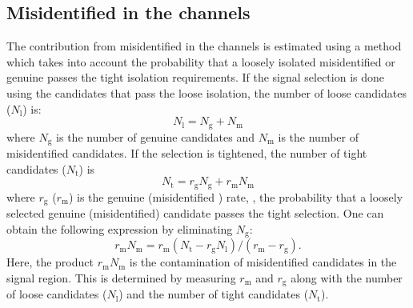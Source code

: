 \subsection{\texorpdfstring{Misidentified \Tau in the \leptonTau channels}{Misidentified tau in the lepton-tau channels}}
\label{sect:bkgFake}
The contribution from misidentified \Tau in the \leptonTau channels is estimated using a method which takes into account the probability
that a loosely isolated misidentified or genuine \Tau passes the tight isolation requirements.
If the signal selection is done using the \Tau candidates that pass the loose isolation,
the number of loose \Tau candidates ($N_\mathrm{l}$) is:
\begin{equation}
N_\mathrm{l} = N_\mathrm{g} + N_\mathrm{m}
\end{equation}
where $N_\mathrm{g}$ is the number of genuine \Tau candidates and $N_\mathrm{m}$ is the number of misidentified
\Tau candidates. If the selection is tightened, the number of tight \Tau candidates ($N_\mathrm{t}$)  is
\begin{equation}
 N_\mathrm{t} = r_\mathrm{g} N_\mathrm{g} + r_\mathrm{m} N_\mathrm{m}
\end{equation}
where $r_\mathrm{g}$ ($r_\mathrm{m}$) is the genuine (misidentified \Tau) rate, \ie, the probability that a loosely selected genuine (misidentified) \Tau candidate passes the  tight  selection.
One can obtain the following expression by eliminating $N_\mathrm{g}$:
\begin{equation}
   r_\mathrm{m} N_\mathrm{m}  = r_\mathrm{m} (N_\mathrm{t} - r_\mathrm{g} N_\mathrm{l})/(r_\mathrm{m}-r_\mathrm{g}).
\end{equation}
Here, the product $r_\mathrm{m} N_\mathrm{m}$ is the contamination of misidentified \Tau candidates in the signal region.
This is determined by measuring $r_\mathrm{m}$ and $r_\mathrm{g}$ along with the number of loose \Tau candidates ($N_\mathrm{l}$) and the number of tight \Tau candidates ($N_\mathrm{t}$).

